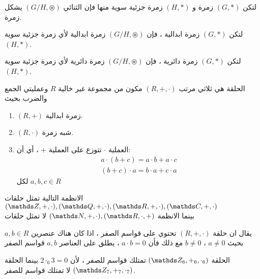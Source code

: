   \begin{theorem}
  	لتكن $(G, *)$ زمرة و $(H, *)$ زمرة جزئية سوية منها فإن الثنائي $(G/H, \circledast)$ يشكل زمرة.
  \end{theorem}
  
  \begin{theorem}
  	لتكن $(G, *)$ زمرة ابدالية ، فإن $(G/H, \circledast)$ زمرة ابدالية لأي زمرة جزئية سوية $(H, *)$.
  \end{theorem}
  
  \begin{theorem}
  	لتكن $(G, *)$ زمرة دائرية ، فإن $(G/H, \circledast)$ زمرة دائرية لأي زمرة جزئية سوية $(H, *)$.
  \end{theorem}
  

 
 \begin{definition}
 	الحلقة هي ثلاثي مرتب $(R, +, \cdot)$ مكون من مجموعة غير خالية $R$ وعمليتي الجمع والضرب بحيث 
 	\begin{enumerate}[label=$\boxed{\arabic*}$]
 		\item $(R, +)$ زمرة ابدالية.
 		\item  $(R, \cdot) $ شبه زمرة.
 		\item العملية $\cdot$ تتوزع على العملية + ، أي أن:
 		\begin{gather*}
 			a\cdot (b+c) = a\cdot b + a\cdot c \tag{التوزيع من اليسار}\\
 			(b + c) \cdot a = b\cdot a + c\cdot a \tag{التوزيع من اليمين}
 		\end{gather*}
 		لكل $a ,b,c\in R$
 	\end{enumerate}
 \end{definition}
 
 \begin{example}
 	الانظمة التالية تمثل حلقات
 	$
 	(\Z, + ,\cdot), (\Q, + ,\cdot),(\R, + ,\cdot),(\C, + ,\cdot)
 	$\\
 	بينما الانظمة 
 	$
 	(\N, +, \cdot), (\R, \cdot, +)
 	$
 	لا تمثل حلقات
 \end{example}
 
 \begin{definition}
 	يقال ان حلقة $(R, +, \cdot)$ تحتوي على قواسم الصفر ، اذا كان هناك عنصرين $a, b\in R$ بحيث $a\neq 0$ ، $b\neq 0$ مع ذلك فأن $a\cdot b=0$ ، يطلق على العناصر $a,b$ قواسم الصفر
 \end{definition}
 
 \begin{example}
 	الحلقة
 	$(\Z_6, +_6, \cdot_6)$ تمتلك قواسم للصفر ، لأن $2\cdot_6 3=0 $ بينما الحلقة 
 	$(\Z_7, +_7, \cdot_7)$ لا تمتلك قواسم للصفر.
 \end{example}
 
